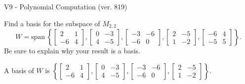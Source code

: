 \begin{exercise}
  \begin{exerciseTitle}V9 - Polynomial Computation (ver. 819)\end{exerciseTitle}
  \begin{exerciseStatement}
    Find a basis for the subspace of \(M_{2,2}\) 
\[W=\mathrm{span}\ \left\{\left[\begin{array}{cc}
2 & 1 \\
-6 & 4
\end{array}\right] , \left[\begin{array}{cc}
0 & -3 \\
4 & -5
\end{array}\right] , \left[\begin{array}{cc}
-3 & -6 \\
-6 & 0
\end{array}\right] , \left[\begin{array}{cc}
2 & -5 \\
1 & -2
\end{array}\right] , \left[\begin{array}{cc}
-6 & 4 \\
-5 & 5
\end{array}\right]\right\}.\]
 Be sure to explain why your result is a basis.


  \end{exerciseStatement}
  \begin{exerciseAnswer}
   A basis of \(W\) is  \(\left\{\left[\begin{array}{cc}
2 & 1 \\
-6 & 4
\end{array}\right] , \left[\begin{array}{cc}
0 & -3 \\
4 & -5
\end{array}\right] , \left[\begin{array}{cc}
-3 & -6 \\
-6 & 0
\end{array}\right] , \left[\begin{array}{cc}
2 & -5 \\
1 & -2
\end{array}\right]\right\}\).
  


  \end{exerciseAnswer}
\end{exercise}